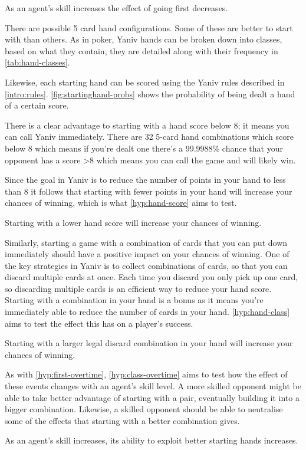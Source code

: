 \documentclass[../main.tex]{subfiles}
\begin{document}
\begin{hyp} \label{hyp:first-overtime}
As an agent's skill increases the effect of going first decreases. 
\end{hyp}

There are  possible 5 card hand configurations. Some of these are better to start with than others. As in poker, Yaniv hands can be broken down into classes, based on what they contain, they are detailed along with their frequency in \cref{tab:hand-classes}. 

Likewise, each starting hand can be scored using the Yaniv rules described in \cref{intro:rules}. \cref{fig:startinghand-probs} shows the probability of being dealt a hand of a certain score.

There is a clear advantage to starting with a hand score below 8; it means you can call Yaniv immediately. There are 32 5-card hand combinations which score below 8 which means if you're dealt one there's a 99.9988\% chance that  your opponent has a score >8 which means you can call the game and will likely win. 

Since the goal in Yaniv is to reduce the number of points in your hand to less than 8 it follows that starting with fewer points in your hand will increase your chances of winning, which is what \cref{hyp:hand-score} aims to test.

\begin{hyp} \label{hyp:hand-score}
Starting with a lower hand score will increase your chances of winning. 
\end{hyp}

Similarly, starting a game with a combination of cards that you can put down immediately should have a positive impact on your chances of winning. One of the key strategies in Yaniv is to collect combinations of cards, so that you can discard multiple cards at once. Each time you discard you only pick up one card, so discarding multiple cards is an efficient way to reduce your hand score. Starting with a combination in your hand is a bonus as it means you're immediately able to reduce the number of cards in your hand. \cref{hyp:hand-class} aims to test the effect this has on a player's success.

\begin{hyp} \label{hyp:hand-class}
Starting with a larger legal discard combination in your hand will increase your chances of winning.
\end{hyp}

As with \cref{hyp:first-overtime}, \cref{hyp:class-overtime} aims to test how the effect of these events changes with an agent's skill level. A more skilled opponent might be able to take better advantage of starting with a pair, eventually building it into a bigger combination. Likewise, a skilled opponent should be able to neutralise some of the effects that starting with a better combination gives. 

\begin{hyp} \label{hyp:class-overtime}
As an agent's skill increases, its ability to exploit better starting hands increases.
\end{hyp}
\end{document}
